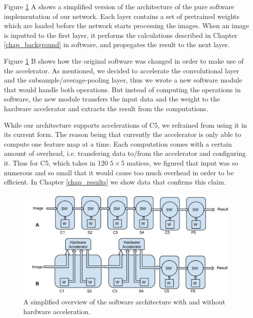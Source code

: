 Figure \ref{fig_software_architecture} A shows a simplified version of the architecture of the pure software implementation of our network. Each layer contains a set of pretrained weights which are loaded before the network starts processing the images. When an image is inputted to the first layer, it performs the calculations described in Chapter \ref{chap_background} in software, and propegates the result to the next layer. 

Figure \ref{fig_software_architecture} B shows how the original software was changed in order to make use of the accelerator. As mentioned, we decided to accelerate the convolutional layer and the subsample/average-pooling layer, thus we wrote a new software module that would handle both operations. But instead of computing the operations in software, the new module transfers the input data and the weight to the hardware accelerator and extracts the result from the computations. 

While our architecture supports accelerations of C5, we refrained from using it in its current form. The reason being that currently the accelerator is only able to compute one feature map at a time. Each computation comes with a certain amount of overhead, i.e. transfering data to/from the accelerator and configuring it. Thus for C5, which takes in 120 $ 5 \times 5 $ matices, we figured that input was so numerous and so small that it would cause too much overhead in order to be efficient. In Chapter \ref{chap_results} we show data that confirms this claim.


\begin{figure}[h!]
  \centering
      \includegraphics[width=1.0\textwidth]{Figures/Method/SoftwareArchitecture}
    \caption{A simplified overview of the software architecture with and without hardware acceleration.}
    \label{fig_software_architecture}
\end{figure}

